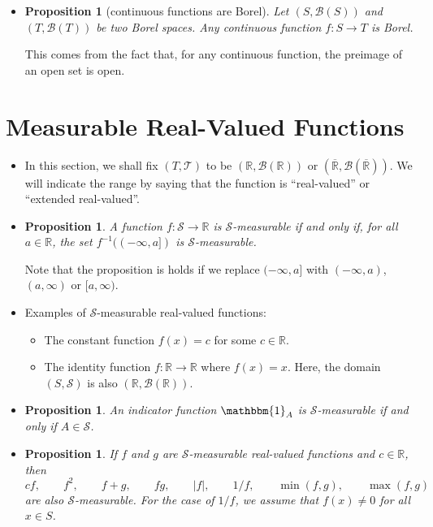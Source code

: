 \documentclass[10pt]{article}
\newtheorem{proposition}[lemma]{Proposition}
\numberwithin{lemma}{section}
\newcommand{\mcal}[1]{\mathcal{#1}}
\newcommand{\Real}{\mathbb{R}}
\begin{document}
\begin{itemize}
  \item \begin{proposition}[continuous functions are Borel]
    Let $(S, \mcal{B}(S))$ and $(T,\mcal{B}(T))$ be two Borel spaces. 
    Any continuous function $f: S \rightarrow T$ is Borel.
  \end{proposition}
  This comes from the fact that, for any continuous function, the preimage of an open set is open.
\end{itemize}

\section{Measurable Real-Valued Functions}

\begin{itemize}
  \item In this section, we shall fix $(T, \mcal{T})$ to be $(\Real, \mcal{B}(\Real))$ or $(\overline{\Real}, \mcal{B}(\overline{\Real}))$. We will indicate the range by saying that the function is ``real-valued'' or ``extended real-valued''.

  \item \begin{proposition}
    A function $f: \mcal{S} \rightarrow \Real$ is $\mcal{S}$-measurable if and only if, for all $a \in \Real$, the set $f^{-1}((-\infty, a])$ is $\mcal{S}$-measurable. 
   \end{proposition}
   Note that the proposition is holds if we replace $(-\infty, a]$ with $(-\infty, a)$, $(a, \infty)$ or $[a, \infty)$. 

  \item Examples of $\mcal{S}$-measurable real-valued functions:
  \begin{itemize}
    \item The constant function $f(x) = c$ for some $c \in \Real$.
    \item The identity function $f: \Real \rightarrow \Real$ where $f(x) = x$. Here, the domain $(S,\mcal{S})$ is also $(\Real, \mcal{B}(\Real))$.
  \end{itemize}

  \item \begin{proposition}
    An indicator function $\mathbbm{1}_A$ is $\mcal{S}$-measurable if and only if $A \in \mcal{S}$.
  \end{proposition}

  \item \begin{proposition}
    If $f$ and $g$ are $\mcal{S}$-measurable real-valued functions and $c \in \Real$, then 
    $$ cf, \qquad f^2, \qquad f+g, \qquad fg, \qquad |f|, \qquad 1/f, \qquad \min(f,g), \qquad \max(f,g) $$
    are also $\mcal{S}$-measurable. For the case of $1/f$, we assume that $f(x) \neq 0$ for all $x \in S$.
  \end{proposition}


\end{itemize}
\end{document}
